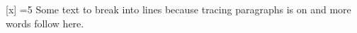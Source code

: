     
     
\hsize=2in \def\a#1{[#1]}\a{x}
\begingroup {}=5 \endgroup
Some text to break into lines because tracing paragraphs is on and more words follow here.\par
\showgroups {} \showifs
{}
\bye
